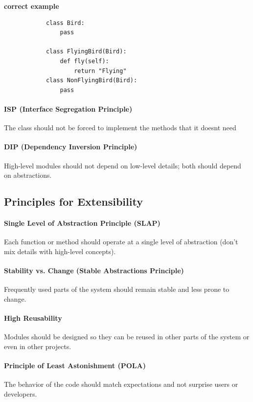         \textbf{correct example}
        \begin{verbatim}
            class Bird:
                pass

            class FlyingBird(Bird):
                def fly(self):
                    return "Flying"
            class NonFlyingBird(Bird):
                pass
        \end{verbatim}
    
    \paragraph{ISP (Interface Segregation Principle)}
        The class should not be forced to implement the methods that it doesnt need
    
    \paragraph{DIP (Dependency Inversion Principle)}
        High-level modules should not depend on low-level details; both should depend on abstractions.

\subsection{Principles for Extensibility}
    
    \paragraph{Single Level of Abstraction Principle (SLAP)}
        Each function or method should operate at a single level of abstraction (don’t mix details with high-level concepts).
    
    \paragraph{Stability vs. Change (Stable Abstractions Principle)}
        Frequently used parts of the system should remain stable and less prone to change.
    
    \paragraph{High Reusability}
        Modules should be designed so they can be reused in other parts of the system or even in other projects.
    
    \paragraph{Principle of Least Astonishment (POLA)}
        The behavior of the code should match expectations and not surprise users or developers.

